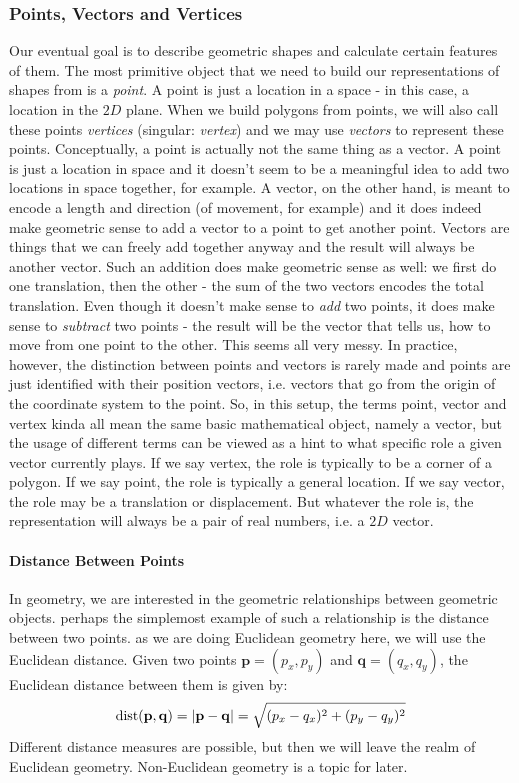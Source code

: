 \subsubsection{Points, Vectors and Vertices}
Our eventual goal is to describe geometric shapes and calculate certain features of them. The most primitive object that we need to build our representations of shapes from is a \emph{point}. A point is just a location in a space - in this case, a location in the $2D$ plane. When we build polygons from points, we will also call these points \emph{vertices} (singular: \emph{vertex}) and we may use \emph{vectors} to represent these points. Conceptually, a point is actually not the same thing as a vector. A point is just a location in space and it doesn't seem to be a meaningful idea to add two locations in space together, for example. A vector, on the other hand, is meant to encode a length and direction (of movement, for example) and it does indeed make geometric sense to add a vector to a point to get another point. Vectors are things that we can freely add together anyway and the result will always be another vector. Such an addition does make geometric sense as well: we first do one translation, then the other - the sum of the two vectors encodes the total translation. Even though it doesn't make sense to \emph{add} two points, it does make sense to \emph{subtract} two points - the result will be the vector that tells us, how to move from one point to the other. This seems all very messy. In practice, however, the distinction between points and vectors is rarely made and points are just identified with their position vectors, i.e. vectors that go from the origin of the coordinate system to the point. So, in this setup, the terms point, vector and vertex kinda all mean the same basic mathematical object, namely a vector, but the usage of different terms can be viewed as a hint to what specific role a given vector currently plays. If we say vertex, the role is typically to be a corner of a polygon. If we say point, the role is typically a general location. If we say vector, the role may be a translation or displacement. But whatever the role is, the representation will always be a pair of real numbers, i.e. a $2D$ vector.

\paragraph{Distance Between Points}
In geometry, we are interested in the geometric relationships between geometric objects. perhaps the simplemost example of such a relationship is the distance between two points. as we are doing Euclidean geometry here, we will use the Euclidean distance. Given two points $\mathbf{p} = (p_x, p_y)$ and $\mathbf{q} = (q_x, q_y)$, the Euclidean distance between them is given by:
\begin{equation}
\operatorname{dist}(\mathbf{p,q}) = |\mathbf{p} - \mathbf{q}| = \sqrt{(p_x - q_x)^2 + (p_y - q_y)^2}
\end{equation}
Different distance measures are possible, but then we will leave the realm of Euclidean geometry. Non-Euclidean geometry is a topic for later.

